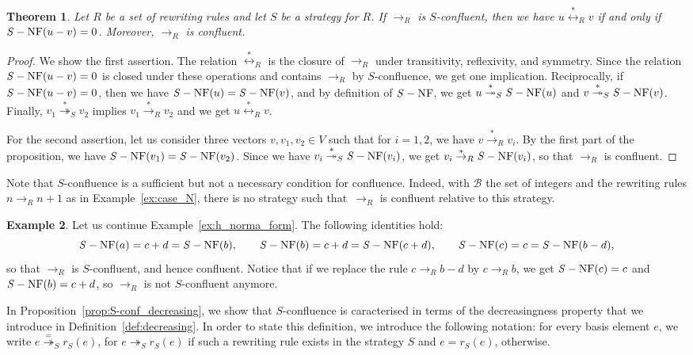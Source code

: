 \documentclass[10pt]{easychair}
\newtheorem{theorem}{Theorem}[section]
\theoremstyle{definition}
\newtheorem{example}[theorem]{Example}
\newcommand\basis{\mathscr{B}}
\newcommand\rewR{\to_R}
\newcommand\rewS{\twoheadrightarrow_S}
\newcommand\transR{\overset{*}{\to}_R}
\newcommand\transS{\overset{*}{\twoheadrightarrow}_S}
\newcommand\equivR{\overset{*}{\leftrightarrow}_R}
\DeclareMathOperator{\SNF}{{\it S}-NF}
\begin{document}
\begin{theorem}\label{thm:S-confluence_criterion}
  Let $R$ be a set of rewriting rules and let $S$ be a strategy for $R$.
  If $\rewR$ is $S$-confluent, then we have $u\equivR v$ if and only if
  $\SNF(u-v)=0$. Moreover, $\rewR$ is confluent.
\end{theorem}

\begin{proof}
  We show the first assertion. The relation $\equivR$ is the closure of
  $\rewR$ under transitivity, reflexivity, and symmetry. Since the
  relation $\SNF(u-v)=0$ is closed under these operations and contains
  $\rewR$ by $S$-confluence, we get one implication. Reciprocally, if
  $\SNF(u-v)=0$, then we have $\SNF(u)=\SNF(v)$, and by definition of
  $\SNF$, we get $u\transS\SNF(u)$ and $v\transS\SNF(v)$. Finally,
  $v_1\transS v_2$ implies $v_1\transR v_2$ and we get $u\equivR v$.

  For the second assertion, let us consider three vectors
  $v,v_1,v_2\in V$ such that for $i=1,2$, we have $v\transR v_i$. By the
  first part of the proposition, we have $\SNF(v_1)=\SNF(v_2)$. Since we
  have $v_i\transS\SNF(v_i)$, we get $v_i\transR\SNF(v_i)$, so that
  $\rewR$ is confluent.
\end{proof}
\smallskip

Note that $S$-confluence is a sufficient but not a necessary condition for
confluence. Indeed, with $\basis$ the set of integers and the rewriting rules
$n\rewR n+1$ as in Example~\ref{ex:case_N}, there is no strategy such
that~$\rewR$ is confluent relative to this strategy.  \smallskip

\begin{example}\label{ex:S-conf}
  Let us continue Example~\ref{ex:h_norma_form}. The following identities
  hold:
  \[\SNF(a)=c+d=\SNF(b),\qquad\SNF(b)=c+d=\SNF(c+d),\qquad
  \SNF(c)=c=\SNF(b-d),
  \smallskip\]
  so that $\rewR$ is $S$-confluent, and hence confluent. Notice that if
  we replace the rule $c\rewR b-d$ by $c\rewR b$, we get $\SNF(c)=c$ and
  $\SNF(b)=c+d$, so $\rewR$ is not $S$-confluent anymore. 
\end{example}
\smallskip

In Proposition~\ref{prop:S-conf_decreasing}, we show that $S$-confluence
is caracterised in terms of the decreasingness property that we introduce
in Definition~\ref{def:decreasing}. In order to state this definition, we
introduce the following notation: for every basis element $e$, we write
$e\overset{=}{\twoheadrightarrow}_Sr_S(e)$, for $e\rewS r_S(e)$ if such a
rewriting rule exists in the strategy $S$ and $e=r_S(e)$, otherwise.
\smallskip
\end{document}
